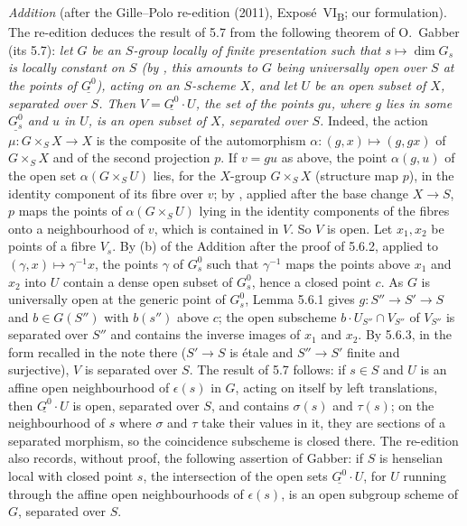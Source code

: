 \par\medskip\noindent
{}\label{thm:sga3-VIB-5.7}%
\emph{Addition} (after the Gille--Polo re-edition (2011), Expos\'e~VI\textsubscript{B}; our formulation).
The re-edition deduces the result of 5.7 from the following theorem of O.~Gabber (its 5.7): \emph{let \(G\) be an
\(S\)-group locally of finite presentation such that \(s\mapsto\dim G_s\) is locally constant on \(S\) (by
, this amounts to \(G\) being universally open over \(S\) at the points of
\(\underline{G^0}\)), acting on an \(S\)-scheme \(X\), and let \(U\) be an open subset of \(X\), separated over
\(S\). Then \(V=\underline{G^0}\cdot U\), the set of the points \(gu\), where \(g\) lies in some
\(\underline{G^0_s}\) and \(u\) in \(U\), is an open subset of \(X\), separated over \(S\).} Indeed, the action
\(\mu\colon G\times_SX\to X\) is the composite of the automorphism \(\alpha\colon(g,x)\mapsto(g,gx)\) of
\(G\times_SX\) and of the second projection \(p\). If \(v=gu\) as above, the point \(\alpha(g,u)\) of the open
set \(\alpha(G\times_SU)\) lies, for the \(X\)-group \(G\times_SX\) (structure map \(p\)), in the identity
component of its fibre over \(v\); by , applied after the base change
\(X\to S\), \(p\) maps the points of \(\alpha(G\times_SU)\) lying in the identity components of the fibres onto a
neighbourhood of \(v\), which is contained in \(V\). So \(V\) is open. Let \(x_1,x_2\) be points of a fibre
\(V_s\). By (b) of the Addition after the proof of 5.6.2, applied to \((\gamma,x)\mapsto\gamma^{-1}x\), the points
\(\gamma\) of \(G^0_s\) such that \(\gamma^{-1}\) maps the points above \(x_1\) and \(x_2\) into \(U\) contain a
dense open subset of \(G^0_s\), hence a closed point \(c\). As \(G\) is universally open at the generic point of
\(G^0_s\), Lemma 5.6.1 gives \(g\colon S''\to S'\to S\) and \(b\in G(S'')\) with \(b(s'')\) above \(c\); the open
subscheme \(b\cdot U_{S''}\cap V_{S''}\) of \(V_{S''}\) is separated over \(S''\) and contains the inverse images
of \(x_1\) and \(x_2\). By 5.6.3, in the form recalled in the note there (\(S'\to S\) is \'etale and \(S''\to S'\)
finite and surjective), \(V\) is separated over \(S\). The result of 5.7 follows: if \(s\in S\) and \(U\) is an
affine open neighbourhood of \(\epsilon(s)\) in \(G\), acting on itself by left translations, then
\(\underline{G^0}\cdot U\) is open, separated over \(S\), and contains \(\sigma(s)\) and \(\tau(s)\); on the
neighbourhood of \(s\) where \(\sigma\) and \(\tau\) take their values in it, they are sections of a separated
morphism, so the coincidence subscheme is closed there. The re-edition also records, without proof, the following
assertion of Gabber: if \(S\) is henselian local with closed point \(s\), the intersection of the open sets
\(\underline{G^0}\cdot U\), for \(U\) running through the affine open neighbourhoods of \(\epsilon(s)\), is an open
subgroup scheme of \(G\), separated over \(S\).
\par\medskip
